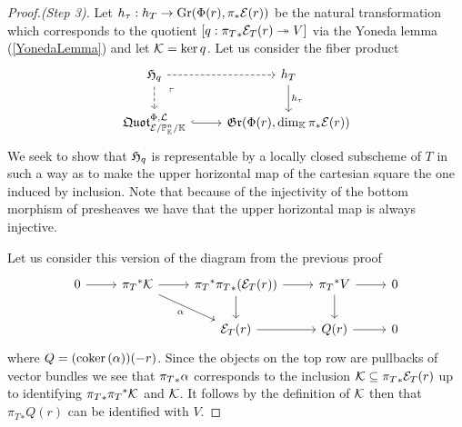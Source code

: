 \begin{proof}[Proof.(Step 3)]
Let $h_\tau:h_T\to \mathrm{Gr}(\Phi(r),\pi_\ast\mathcal{E}(r))$ be the natural transformation which corresponds to the quotient $[q:{\pi_T}_\ast\mathcal{E}_T(r)\twoheadrightarrow V]$ via the Yoneda lemma (\ref{YonedaLemma}) and let $\mathcal{K}=\ker q$. Let us consider the fiber product
\[\begin{tikzcd}
	{\Hf_q} & {h_T} \\
	{\quotf^{\Phi,\Lc}_{\Ec/\Pj^n_\K/\K}} & {\gr(\Phi(r),\dim_\K\pi_\ast\Ec(r))}
	\arrow[dashed, from=1-1, to=1-2]
	\arrow[dashed, from=1-1, to=2-1]
	\arrow["{h_\tau}", from=1-2, to=2-2]
	\arrow[""{name=0, anchor=center, inner sep=0}, hook, from=2-1, to=2-2]
	\arrow["\ulcorner"{anchor=center, pos=0.125}, draw=none, from=1-1, to=0]
\end{tikzcd}\]
We seek to show that $\mathfrak{H}_q$ is representable by a locally closed subscheme of $T$ in such a way as to make the upper horizontal map of the cartesian square the one induced by inclusion. Note that because of the injectivity of the bottom morphism of presheaves we have that the upper horizontal map is always injective. 

Let us consider this version of the diagram from the previous proof
\[\begin{tikzcd}
	0 & {{\pi_T}^\ast\Kc} & {{\pi_T}^\ast{\pi_T}_\ast(\Ec_T(r))} & {{\pi_T}^\ast V} & 0 \\
	&& {\Ec_T(r)} & {Q(r)} & 0
	\arrow[from=1-1, to=1-2]
	\arrow[from=1-2, to=1-3]
	\arrow["\al"', from=1-2, to=2-3]
	\arrow[from=1-3, to=1-4]
	\arrow[from=1-3, to=2-3]
	\arrow[from=1-4, to=1-5]
	\arrow[from=1-4, to=2-4]
	\arrow[from=2-3, to=2-4]
	\arrow[from=2-4, to=2-5]
\end{tikzcd}\]
where $Q=(\mathrm{coker}\,(\alpha))(-r)$. Since the objects on the top row are pullbacks of vector bundles we see that ${\pi_T}_\ast\alpha$ corresponds to the inclusion $\mathcal{K}\subseteq {\pi_T}_\ast\mathcal{E}_T(r)$ up to identifying ${\pi_T}_\ast{\pi_T}^\ast\mathcal{K}$ and $\mathcal{K}$. It follows by the definition of $\mathcal{K}$ then that ${\pi_T}_\ast Q(r)$ can be identified with $V$.


\end{proof}
